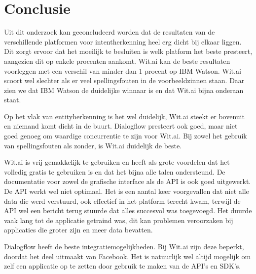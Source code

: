 
\chapter{Conclusie}
\label{ch:conclusie}


Uit dit onderzoek kan geconcludeerd worden dat de resultaten van de verschillende platformen voor intentherkenning heel erg dicht bij elkaar liggen. Dit zorgt ervoor dat het moeilijk te besluiten is welk platform het beste presteert, aangezien dit op enkele procenten aankomt. Wit.ai kan de beste resultaten voorleggen met een verschil van minder dan 1 procent op IBM Watson. Wit.ai scoort wel slechter als er veel spellingsfouten in de voorbeeldzinnen staan. Daar zien we dat IBM Watson de duidelijke winnaar is en dat Wit.ai bijna onderaan staat.

Op het vlak van entityherkenning is het wel duidelijk, Wit.ai steekt er bovenuit en niemand komt dicht in de buurt. Dialogflow presteert ook goed, maar niet goed genoeg om waardige concurrentie te zijn voor Wit.ai. Bij zowel het gebruik van spellingsfouten als zonder, is Wit.ai duidelijk de beste.

Wit.ai is vrij gemakkelijk te gebruiken en heeft als grote voordelen dat het volledig gratis te gebruiken is en dat het bijna alle talen ondersteund. De documentatie voor zowel de grafische interface als de API is ook goed uitgewerkt. De API werkt wel niet optimaal. Het is een aantal keer voorgevallen dat niet alle data die werd verstuurd, ook effectief in het platform terecht kwam, terwijl de API wel een bericht terug stuurde dat alles succesvol was toegevoegd. Het duurde vaak lang tot de applicatie getraind was, dit kan problemen veroorzaken bij applicaties die groter zijn en meer data bevatten.

Dialogflow heeft de beste integratiemogelijkheden. Bij Wit.ai zijn deze beperkt, doordat het deel uitmaakt van Facebook. Het is natuurlijk wel altijd mogelijk om zelf een applicatie op te zetten door gebruik te maken van de API’s en SDK’s.

